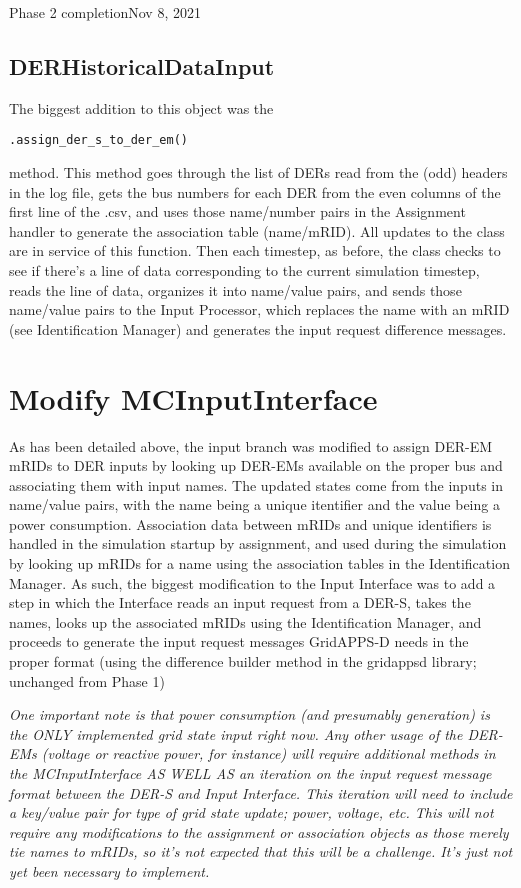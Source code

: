 \begin{entry}{Phase 2 completion}{Nov 8, 2021}
    \subsection*{DERHistoricalDataInput}
    The biggest addition to this object was the \begin{verbatim}.assign_der_s_to_der_em()\end{verbatim} method. This
    method goes through the list of DERs read from the (odd) headers in the log file, gets the bus numbers for each
    DER from the even columns of the first line of the .csv, and uses those name/number pairs in the Assignment
    handler to generate the association table (name/mRID). All updates to the class are in service of this function.
    Then each timestep, as before, the class checks to see if there's a line of data corresponding to the current
    simulation timestep, reads the line of data, organizes it into name/value pairs, and sends those name/value pairs
    to the Input Processor, which replaces the name with an mRID (see Identification Manager) and generates the input
    request difference messages.

    \section*{Modify MCInputInterface}
    As has been detailed above, the input branch was modified to assign DER-EM mRIDs to DER inputs by looking up
    DER-EMs available on the proper bus and associating them with input names. The updated states come from the inputs
    in name/value pairs, with the name being a unique itentifier and the value being a power consumption. Association
    data between mRIDs and unique identifiers is handled in the simulation startup by assignment, and used during the
    simulation by looking up mRIDs for a name using the association tables in the Identification Manager. As such, the
    biggest modification to the Input Interface was to add a step in which the Interface reads an input request from a
    DER-S, takes the names, looks up the associated mRIDs using the Identification Manager, and proceeds to generate
    the input request messages GridAPPS-D needs in the proper format (using the difference builder method in the
    gridappsd library; unchanged from Phase 1)

    \textit{One important note is that power consumption (and presumably generation) is the ONLY implemented grid
    state input right now. Any other usage of the DER-EMs (voltage or reactive power, for instance) will require
    additional methods in the MCInputInterface AS WELL AS an iteration on the input request message format between
    the DER-S and Input Interface. This iteration will need to include a key/value pair for type of grid state
    update; power, voltage, etc. This will not require any modifications to the assignment or association objects as
    those merely tie names to mRIDs, so it's not expected that this will be a challenge. It's just not yet been
    necessary to implement.}


\end{entry}
